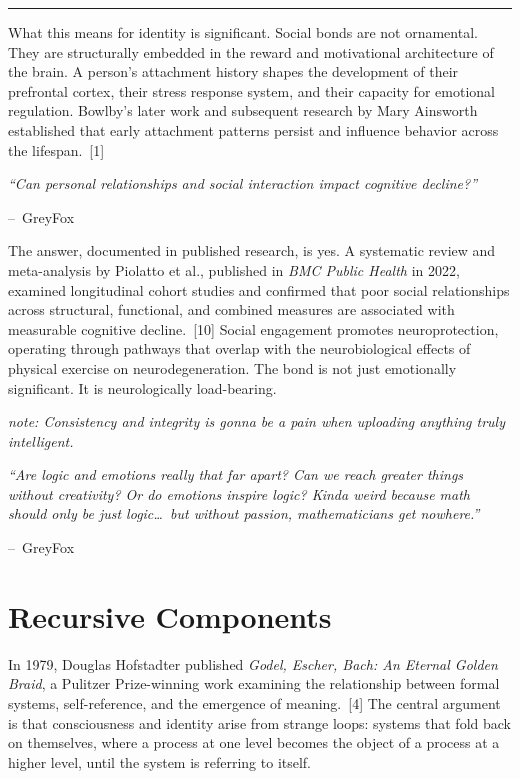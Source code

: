 \documentclass[11pt,a4paper]{article}
\renewenvironment{quote}
  {\list{}{\leftmargin=2.2em\rightmargin=2.2em\topsep=0.4em\parsep=0.3em}%
   \item\relax\itshape}
  {\endlist}
\newcommand{\attrib}[1]{\par\vspace{0.2em}\normalfont\small\hspace*{0em}--\ #1\par}
\newcommand{\nbk}[1]{\par\vspace{0.3em}\noindent\textit{note: #1}\par\vspace{0.3em}}
\begin{document}
\vspace{0.1em}
\noindent\rule{\linewidth}{0.4pt}
\vspace{0.3em}

What this means for identity is significant. Social bonds are not ornamental. They are structurally embedded in the reward and motivational architecture of the brain. A person's attachment history shapes the development of their prefrontal cortex, their stress response system, and their capacity for emotional regulation. Bowlby's later work and subsequent research by Mary Ainsworth established that early attachment patterns persist and influence behavior across the lifespan.~[1]

\begin{quote}
``Can personal relationships and social interaction impact cognitive decline?''
\attrib{GreyFox}
\end{quote}

The answer, documented in published research, is yes. A systematic review and meta-analysis by Piolatto et al., published in \textit{BMC Public Health} in 2022, examined longitudinal cohort studies and confirmed that poor social relationships across structural, functional, and combined measures are associated with measurable cognitive decline.~[10] Social engagement promotes neuroprotection, operating through pathways that overlap with the neurobiological effects of physical exercise on neurodegeneration. The bond is not just emotionally significant. It is neurologically load-bearing.

\nbk{Consistency and integrity is gonna be a pain when uploading anything truly intelligent.}

\begin{quote}
``Are logic and emotions really that far apart? Can we reach greater things without creativity? Or do emotions inspire logic? Kinda weird because math should only be just logic\ldots\ but without passion, mathematicians get nowhere.''
\attrib{GreyFox}
\end{quote}

\section{Recursive Components}

In 1979, Douglas Hofstadter published \textit{Godel, Escher, Bach: An Eternal Golden Braid}, a Pulitzer Prize-winning work examining the relationship between formal systems, self-reference, and the emergence of meaning.~[4] The central argument is that consciousness and identity arise from strange loops: systems that fold back on themselves, where a process at one level becomes the object of a process at a higher level, until the system is referring to itself.
\end{document}
